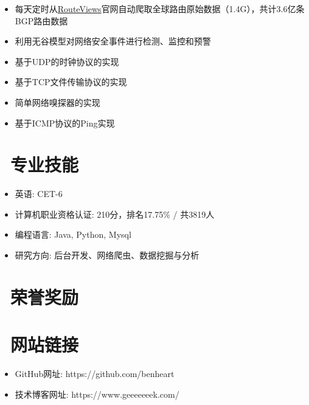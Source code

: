 \documentclass{resume}
\begin{document}
    \begin{onehalfspacing}
        \begin{itemize}
            \item 每天定时从\href{http://www.routeviews.org}{RouteViews}官网自动爬取全球路由原始数据（1.4G），共计3.6亿条BGP路由数据
            \item 利用无谷模型对网络安全事件进行检测、监控和预警
        \end{itemize}
    \end{onehalfspacing}

    \begin{onehalfspacing}
        \begin{itemize}
            \item 基于UDP的时钟协议的实现
            \item 基于TCP文件传输协议的实现
            \item 简单网络嗅探器的实现
            \item 基于ICMP协议的Ping实现
        \end{itemize}
    \end{onehalfspacing}
    \blankline{ }

    \section{\faCogs\ 专业技能}
    \begin{itemize}[parsep=0.5ex]
        \item 英语: CET-6
        \item 计算机职业资格认证: 210分，排名17.75\% / 共3819人
        \item 编程语言: Java, Python, Mysql
        \item 研究方向: 后台开发、网络爬虫、数据挖掘与分析
    \end{itemize}
    \blankline{ }

    \section{\faTrophy\ 荣誉奖励}
    \blankline{ }

    \section{\faLink\ 网站链接}
    \begin{itemize}[parsep=0.5ex]
        \item GitHub网址: https://github.com/benheart
        \item 技术博客网址: https://www.geeeeeeek.com/
    \end{itemize}
\end{document}

